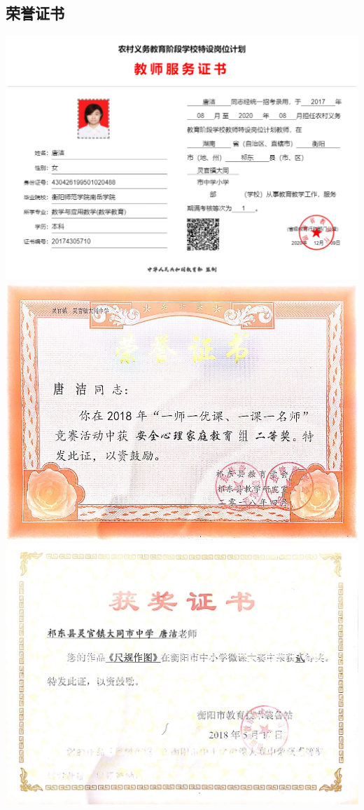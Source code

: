 \documentclass[UFT8]{ctexart}%
\begin{document}
\subsection{荣誉证书}
\begin{center}
 \includegraphics[scale=0.2]{figs/特岗服务证书.png }
 \includegraphics[scale=0.37]{figs/2018-04.png }
 \includegraphics[scale=0.25]{figs/2018-05.png }

\end{center}
\end{document}
